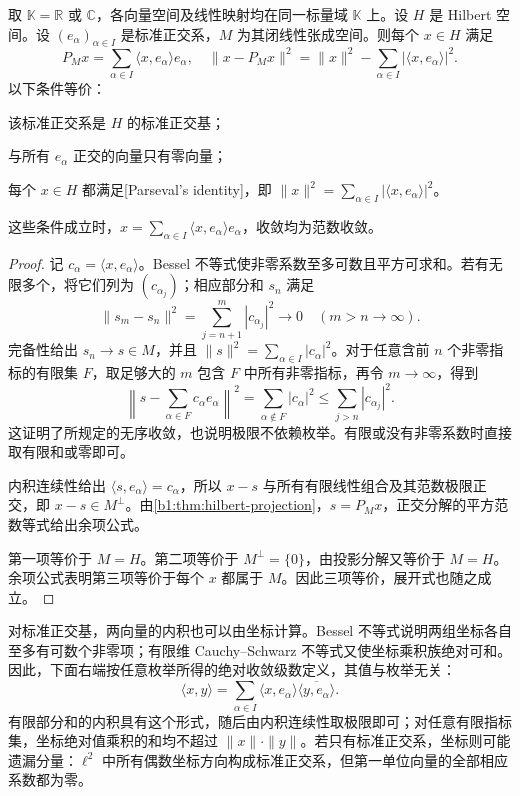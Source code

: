 \begin{theorem}\label{b1:thm:orthonormal-expansion}
取 \(\mathbb K=\mathbb R\) 或 \(\mathbb C\)，各向量空间及线性映射均在同一标量域 \(\mathbb K\) 上。设 \(H\) 是 Hilbert 空间。设 \((e_\alpha)_{\alpha\in I}\) 是标准正交系，\(M\) 为其闭线性张成空间。则每个 \(x\in H\) 满足
\[
P_Mx=\sum_{\alpha\in I}\langle x,e_\alpha\rangle e_\alpha,
\quad
\|x-P_Mx\|^2=\|x\|^2-\sum_{\alpha\in I}|\langle x,e_\alpha\rangle|^2.
\]
以下条件等价：
\begin{equivalences}
  \item\label{b1:item:orthonormal-total} 该标准正交系是 \(H\) 的标准正交基；
  \item\label{b1:item:orthonormal-zero-complement} 与所有 \(e_\alpha\) 正交的向量只有零向量；
  \item\label{b1:item:orthonormal-parseval} 每个 \(x\in H\) 都满足[Parseval's identity]，即 \(\|x\|^2=\sum_{\alpha\in I}|\langle x,e_\alpha\rangle|^2\)。
\end{equivalences}
这些条件成立时，\(x=\sum_{\alpha\in I}\langle x,e_\alpha\rangle e_\alpha\)，收敛均为范数收敛。
\end{theorem}
\begin{proof}
记 \(c_\alpha=\langle x,e_\alpha\rangle\)。Bessel 不等式使非零系数至多可数且平方可求和。若有无限多个，将它们列为 \((c_{\alpha_j})\)；相应部分和 \(s_n\) 满足
\[
\|s_m-s_n\|^2=\sum_{j=n+1}^{m}|c_{\alpha_j}|^2\longrightarrow0
\quad(m>n\to\infty).
\]
完备性给出 \(s_n\to s\in M\)，并且 \(\|s\|^2=\sum_{\alpha\in I}|c_\alpha|^2\)。对于任意含前 \(n\) 个非零指标的有限集 \(F\)，取足够大的 \(m\) 包含 \(F\) 中所有非零指标，再令 \(m\to\infty\)，得到
\[
\left\|s-\sum_{\alpha\in F}c_\alpha e_\alpha\right\|^2
=\sum_{\alpha\notin F}|c_\alpha|^2
\leq\sum_{j>n}|c_{\alpha_j}|^2.
\]
这证明了所规定的无序收敛，也说明极限不依赖枚举。有限或没有非零系数时直接取有限和或零即可。

内积连续性给出 \(\langle s,e_\alpha\rangle=c_\alpha\)，所以 \(x-s\) 与所有有限线性组合及其范数极限正交，即 \(x-s\in M^\perp\)。由\cref{b1:thm:hilbert-projection}，\(s=P_Mx\)，正交分解的平方范数等式给出余项公式。

第一项等价于 \(M=H\)。第二项等价于 \(M^\perp=\{0\}\)，由投影分解又等价于 \(M=H\)。余项公式表明第三项等价于每个 \(x\) 都属于 \(M\)。因此三项等价，展开式也随之成立。
\end{proof}

对标准正交基，两向量的内积也可以由坐标计算。Bessel 不等式说明两组坐标各自至多有可数个非零项；有限维 Cauchy--Schwarz 不等式又使坐标乘积族绝对可和。因此，下面右端按任意枚举所得的绝对收敛级数定义，其值与枚举无关：
\[
\langle x,y\rangle
=\sum_{\alpha\in I}\langle x,e_\alpha\rangle\overline{\langle y,e_\alpha\rangle}.
\]
有限部分和的内积具有这个形式，随后由内积连续性取极限即可；对任意有限指标集，坐标绝对值乘积的和均不超过 \(\|x\|\cdot\|y\|\)。若只有标准正交系，坐标则可能遗漏分量：\(\ell^2\) 中所有偶数坐标方向构成标准正交系，但第一单位向量的全部相应系数都为零。

